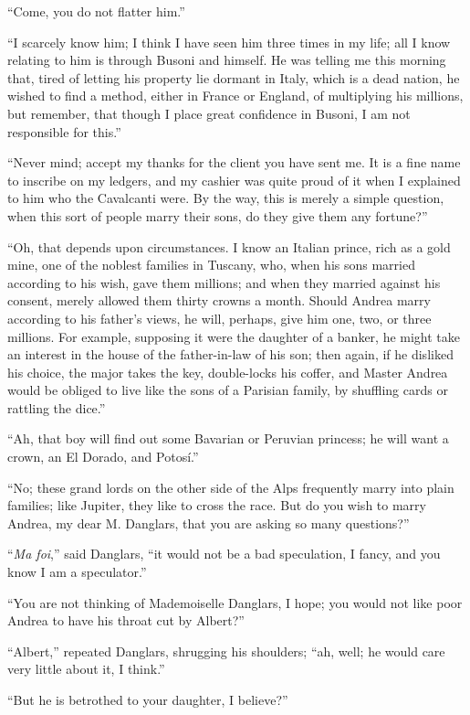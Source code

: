 “Come, you do not flatter him.”

“I scarcely know him; I think I have seen him three times in my life;
all I know relating to him is through Busoni and himself. He was
telling me this morning that, tired of letting his property lie dormant
in Italy, which is a dead nation, he wished to find a method, either in
France or England, of multiplying his millions, but remember, that
though I place great confidence in Busoni, I am not responsible for
this.”

“Never mind; accept my thanks for the client you have sent me. It is a
fine name to inscribe on my ledgers, and my cashier was quite proud of
it when I explained to him who the Cavalcanti were. By the way, this is
merely a simple question, when this sort of people marry their sons, do
they give them any fortune?”

“Oh, that depends upon circumstances. I know an Italian prince, rich as
a gold mine, one of the noblest families in Tuscany, who, when his sons
married according to his wish, gave them millions; and when they
married against his consent, merely allowed them thirty crowns a month.
Should Andrea marry according to his father’s views, he will, perhaps,
give him one, two, or three millions. For example, supposing it were
the daughter of a banker, he might take an interest in the house of the
father-in-law of his son; then again, if he disliked his choice, the
major takes the key, double-locks his coffer, and Master Andrea would
be obliged to live like the sons of a Parisian family, by shuffling
cards or rattling the dice.”

“Ah, that boy will find out some Bavarian or Peruvian princess; he will
want a crown, an El Dorado, and Potosí.”

“No; these grand lords on the other side of the Alps frequently marry
into plain families; like Jupiter, they like to cross the race. But do
you wish to marry Andrea, my dear M. Danglars, that you are asking so
many questions?”

“\textit{Ma foi},” said Danglars, “it would not be a bad speculation, I fancy,
and you know I am a speculator.”

“You are not thinking of Mademoiselle Danglars, I hope; you would not
like poor Andrea to have his throat cut by Albert?”

“Albert,” repeated Danglars, shrugging his shoulders; “ah, well; he
would care very little about it, I think.”

“But he is betrothed to your daughter, I believe?”

